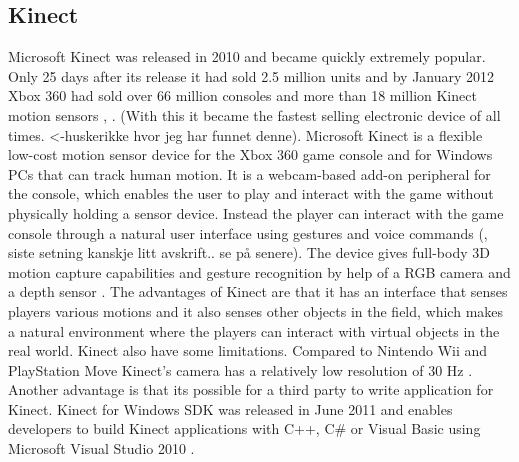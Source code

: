 \subsection{Kinect}
Microsoft Kinect was released in 2010 and became quickly extremely popular. Only 25 days after its release it had sold 2.5 million units and by January 2012 Xbox 360 had sold over 66 million consoles and more than 18 million Kinect motion sensors \cite{consoles}, \cite{kinectsold}. (With this it became the fastest selling electronic device of all times. <-huskerikke hvor jeg har funnet denne). Microsoft Kinect is a flexible low-cost motion sensor device for the Xbox 360 game console  and for Windows PCs that can track human motion. It is a webcam-based add-on peripheral for the console, which enables the user to play and interact with the game without physically holding a sensor device. Instead the player can interact with the game console through a natural user interface using gestures and voice commands (\cite{kinect}, siste setning kanskje litt avskrift.. se på senere). The device gives full-body 3D motion capture capabilities and gesture recognition by help of a RGB camera and a depth sensor \cite{kinect}. The advantages of Kinect are that it has an interface that senses players various motions and it also senses other objects in the field, which makes a natural environment where the players can interact with virtual objects in the real world. Kinect also have some limitations. Compared to Nintendo Wii and PlayStation Move Kinect's camera has a relatively low resolution of 30 Hz \cite{comparison}. Another advantage  is that its possible for a third party to write application for Kinect. Kinect for Windows SDK was released in June 2011 and enables developers to build Kinect applications with C++, C\# or Visual Basic using Microsoft Visual Studio 2010 \cite{kinectwindows}.